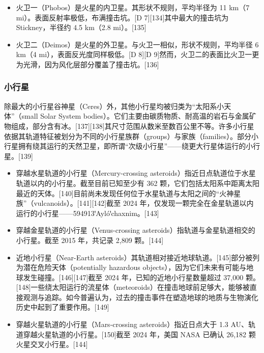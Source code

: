 \begin{itemize}
\item 火卫一（Phobos）是火星的内卫星。其形状不规则，平均半径为 11 km（7 mi）。表面反射率极低，布满撞击坑。[D 7][134]其中最大的撞击坑为 Stickney，半径约 4.5 km（2.8 mi）。[135]
\item 火卫二（Deimos）是火星的外卫星。与火卫一相似，形状不规则，平均半径 6 km（4 mi），表面反光度同样极低。[D 8][D 9]然而，火卫二的表面比火卫一更为光滑，因为风化层部分覆盖了撞击坑。[136]
\end{itemize}
\subsubsection{小行星}

除最大的小行星谷神星（Ceres）外，其他小行星均被归类为“太阳系小天体”（small Solar System bodies）。它们主要由碳质物质、耐高温的岩石与金属矿物组成，部分含有冰。[137][138]其尺寸范围从数米至数百公里不等。许多小行星依据其轨道特征被划分为不同的小行星族群（groups）与家族（families）。部分小行星拥有绕其运行的天然卫星，即所谓“次级小行星”——绕更大行星体运行的小行星。[139]
\begin{itemize}
\item 穿越水星轨道的小行星（Mercury-crossing asteroids）指近日点轨道位于水星轨道以内的小行星。截至目前已知至少有 362 颗，它们包括太阳系中距离太阳最近的天体。[140]目前尚未发现任何位于水星轨道与太阳之间的“火神星族”（vulcanoids）。[141][142]截至 2024 年，仅发现一颗完全在金星轨道以内运行的小行星——594913ꞌAylóꞌchaxnim。[143]
\item 穿越金星轨道的小行星（Venus-crossing asteroids）指轨道与金星轨道相交的小行星。截至 2015 年，共记录 2,809 颗。[144]
\item 近地小行星（Near-Earth asteroids）其轨道相对接近地球轨道。[145]部分被列为潜在危险天体（potentially hazardous objects），因为它们未来有可能与地球发生碰撞。[146][147]截至 2024 年，已知的近地小行星数量超过 37,000 颗。[148]一些绕太阳运行的流星体（meteoroids）在撞击地球前足够大，能够被直接观测与追踪。如今普遍认为，过去的撞击事件在塑造地球的地质与生物演化历史中起到了重要作用。[149]
\item 穿越火星轨道的小行星（Mars-crossing asteroids）指近日点大于 1.3 AU、轨道穿越火星轨道的小行星。[150]截至 2024 年，美国 NASA 已确认 26,182 颗火星交叉小行星。[144]
\end{itemize}




